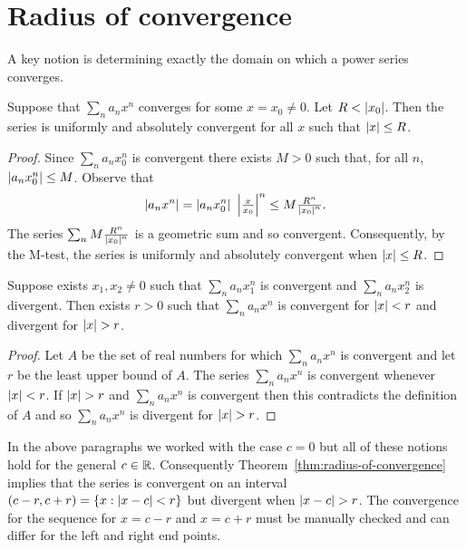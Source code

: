 \section{Radius of convergence}

A key notion is determining exactly the domain on which a power series converges.

\begin{theorem}
  Suppose that \(\sum_{n}a_n x^n\) converges for some \(x=x_0 \neq 0\).
  Let \(R<\left|x_0\right|\).
  Then the series is uniformly and absolutely convergent for all \(x\) such that \(\left|x\right|\leq R\).
\end{theorem}

\begin{proof}
  Since \(\sum_n a_n x_0^n\) is convergent there exists  \(M>0\) such that, for all \(n\), \(\left|a_n x_0^n\right| \leq M\).
  Observe that
  \[
    \abs{a_n x^n} = \abs{a_n x_0^n} \ \abs{\tfrac{x}{x_0}}^n \leq M \tfrac{R^n}{\abs{x_0}^n}.
  \]
  The series
  \(\sum_n M \frac{R^n}{\left|x_0\right|^n}\) is a geometric sum and so convergent.
  Consequently, by the M-test, the series is uniformly and absolutely convergent when \(\left|x\right|\leq R\).
\end{proof}

\begin{theorem}%
  \label{thm:radius-of-convergence}
  Suppose exists  \(x_1,x_2 \neq 0\) such that \(\sum_n a_n x_1^n\) is convergent and \(\sum_n a_n x_2^n\) is divergent.
  Then exists \(r>0\) such that \(\sum_n a_n x^n\) is convergent for \(\left|x\right|<r\) and divergent for \(\abs{x}>r\).
\end{theorem}

\begin{proof}
  Let \(A\) be the set of real numbers for which \(\sum_n a_n x^n\) is convergent and
  let \(r\) be the least upper bound of \(A\).
  The series  \(\sum_n a_n x^n\) is convergent whenever \(\left|x\right|<r\).
  If \(\abs{x}>r\) and \(\sum_n a_n x^n\) is convergent then this contradicts the definition of \(A\) and so  \(\sum_n a_n x^n\) is divergent for \(\abs{x}>r\).
\end{proof}

In the above paragraphs we worked with the case \(c=0\) but all of these notions hold for the general \(c\in \mathbb{R}\). Consequently Theorem~\ref{thm:radius-of-convergence} implies that the series is convergent on an interval \((c-r,c+r) = \{x:\left|x-c\right|<r\}\) but divergent when \(\abs{x-c}>r\).
The convergence for the sequence for \(x=c-r\) and \(x=c+r\) must be manually checked and can differ for the left and right end points.

